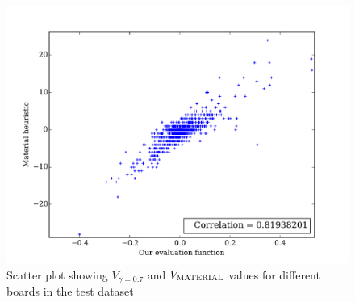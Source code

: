 \begin{figure}[H]
 \includegraphics[scale=0.75]{plots/correlation_eval.pdf}
 \caption[Correlation between $V_{\gamma=0.7}$ and 
$V_{\textsc{MATERIAL}}$]{Scatter plot showing $V_{\gamma=0.7}$ and 
$V_{\textsc{MATERIAL}}$ values for different boards in the test dataset}
\label{figure:correlation}
\end{figure}

